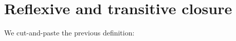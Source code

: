 \hypertarget{reflexive-and-transitive-closure}{%
\section{Reflexive and transitive
closure}\label{reflexive-and-transitive-closure}}

We cut-and-paste the previous definition:

\begin{fence}
\begin{code}%
\>[0]%
\>[7]\AgdaSpace{}%
\<%
\\
\>[0]%
\>[7]\AgdaSpace{}%
\<%
\\
\>[0]\AgdaSpace{}%
\AgdaSpace{}%
\<%
\\
\>[0]%
\>[7]\AgdaSpace{}%
\<%
\\
%
\\[\AgdaEmptyExtraSkip]%
\>[0]\AgdaSpace{}%
\AgdaSpace{}%
\AgdaSymbol{:}\AgdaSpace{}%
\AgdaSpace{}%
\AgdaSymbol{\{}\AgdaSpace{}%
\AgdaSymbol{\}}\AgdaSpace{}%
\AgdaSpace{}%
\AgdaSymbol{(}\AgdaSpace{}%
\AgdaSpace{}%
\AgdaSymbol{)}\AgdaSpace{}%
\AgdaSpace{}%
\AgdaSymbol{(}\AgdaSpace{}%
\AgdaSpace{}%
\AgdaSymbol{)}\AgdaSpace{}%
\AgdaSpace{}%
\AgdaSpace{}%
\<%
\\
%
\\[\AgdaEmptyExtraSkip]%
\>[0][@{}l@{\AgdaIndent{0}}]%
\>[2]%
\>[727I]\AgdaSymbol{:}\AgdaSpace{}%
\AgdaSpace{}%
\AgdaSymbol{\{}\AgdaSpace{}%
\AgdaSymbol{\}}\AgdaSpace{}%
\AgdaSymbol{(}\AgdaSpace{}%
\AgdaSymbol{:}\AgdaSpace{}%
\AgdaSpace{}%
\AgdaSpace{}%
\AgdaSymbol{)}\<%
\\
\>[727I][@{}l@{\AgdaIndent{0}}]%
\>[6]\AgdaComment{--------}\<%
\\

\end{code}
\end{fence}
